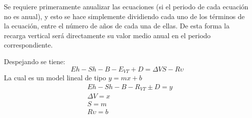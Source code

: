 Se requiere primeramente anualizar las ecuaciones (si el periodo de cada ecuación no es anual), y esto se hace simplemente dividiendo cada uno de los términos de la ecuación, entre el número de años de cada una de ellas. De esta forma la recarga vertical será directamente su valor medio anual en el periodo correspondiente.

Despejando se tiene:
\begin{equation*}
    Eh - Sh - B - E_{VT} + D =\Delta VS- R\upsilon
\end{equation*}
La cual es un model lineal de tipo $y = mx + b$
\begin{align*}
    &Eh - Sh - B- R_{VT} \pm D= y\\
    &\Delta V = x\\
    &S = m\\
    &R\upsilon = b
\end{align*}

